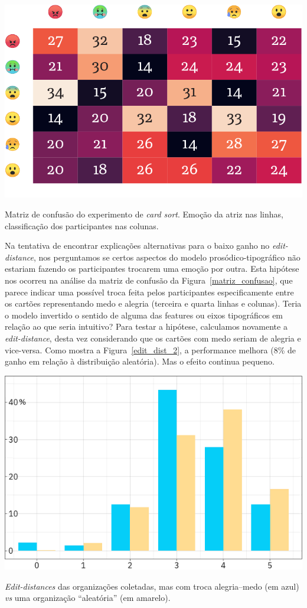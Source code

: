 \documentclass[a4paper]{tufte-handout}
\begin{document}
\begin{marginfigure}
  \includegraphics{imgs/confusion-emoji2.png}
  \caption{Matriz de confusão do experimento de \textit{card sort}. Emoção da atriz nas linhas, classificação dos participantes nas colunas.}
  \label{matriz_confusao}
\end{marginfigure}

Na tentativa de encontrar explicações alternativas para o baixo ganho no \textit{edit-distance}, nos perguntamos se certos aspectos do modelo prosódico-tipográfico não estariam fazendo os participantes trocarem uma emoção por outra. Esta hipótese nos ocorreu na análise da matriz de confusão da Figura~\ref{matriz_confusao}, que parece indicar uma possível troca feita pelos participantes especificamente entre os cartões representando medo e alegria (terceira e quarta linhas e colunas). Teria o modelo invertido o sentido de alguma das features ou eixos tipográficos em relação ao que seria intuitivo? Para testar a hipótese, calculamos novamente a \textit{edit-distance}, desta vez considerando que os cartões com medo seriam de alegria e vice-versa. Como mostra a Figura~\ref{edit_dist_2}, a performance melhora (8\% de ganho em relação à distribuição aleatória). Mas o efeito continua pequeno.

\begin{marginfigure}[-3\baselineskip]
  \includegraphics{imgs/edit_distance_troca.png}
  \caption{\textit{Edit-distances} das organizações coletadas, mas com troca alegria--medo (em azul) \textit{vs} uma organização ``aleatória'' (em amarelo).}
  \label{edit_dist_2}
\end{marginfigure}
\end{document}
